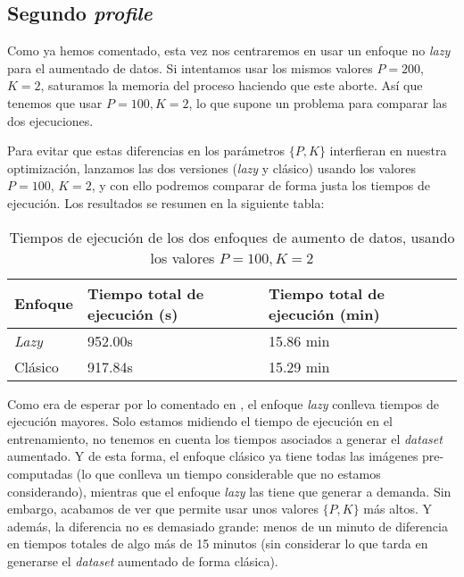 \subsection{Segundo \textit{profile}}

Como ya hemos comentado, esta vez nos centraremos en usar un enfoque no \textit{lazy} para el aumentado de datos. Si intentamos usar los mismos valores $P = 200$, $K = 2$, saturamos la memoria del proceso haciendo que este aborte. Así que tenemos que usar $P = 100, K = 2$, lo que supone un problema para comparar las dos ejecuciones.

Para evitar que estas diferencias en los parámetros $\{P, K\}$ interfieran en nuestra optimización, lanzamos las dos versiones (\textit{lazy} y clásico) usando los valores $P = 100$, $K = 2$, y con ello podremos comparar de forma justa los tiempos de ejecución. Los resultados se resumen en la siguiente tabla:

\begin{table}[H]
\centering
\begin{tabular}{|l|l|l|}
    \hline
    \textbf{Enfoque} & \textbf{Tiempo total de ejecución (s)} & \textbf{Tiempo total de ejecución (min)} \\
    \hline

    \textit{Lazy} & 952.00s & 15.86 min \\
    Clásico       & 917.84s & 15.29 min \\

    \hline

\end{tabular}
\caption{Tiempos de ejecución de los dos enfoques de aumento de datos, usando los valores $P = 100, K = 2$}
\end{table}

Como era de esperar por lo comentado en , el enfoque \textit{lazy} conlleva tiempos de ejecución mayores. Solo estamos midiendo el tiempo de ejecución en el entrenamiento, no tenemos en cuenta los tiempos asociados a generar el \textit{dataset} aumentado. Y de esta forma, el enfoque clásico ya tiene todas las imágenes pre-computadas (lo que conlleva un tiempo considerable que no estamos considerando), mientras que el enfoque \textit{lazy} las tiene que generar a demanda. Sin embargo, acabamos de ver que permite usar unos valores $\{P, K\}$ más altos. Y además, la diferencia no es demasiado grande: menos de un minuto de diferencia en tiempos totales de algo más de 15 minutos (sin considerar lo que tarda en generarse el \textit{dataset} aumentado de forma clásica).

